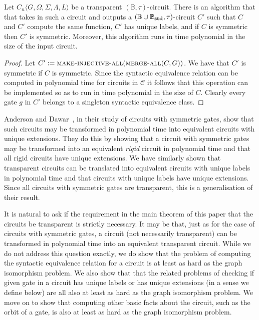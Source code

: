 \documentclass[../paper.tex]{subfiles}
\begin{document}
\begin{prop}
  Let $C_n \langle G, \Omega, \Sigma, \Lambda, L \rangle$ be a transparent
  $(\mathbb{B}, \tau)$-circuit. There is an algorithm that that takes in such a
  circuit and outputs a $(\mathbb{B} \cup \mathbb{B}_{\text{\textbf{std}}}, \tau)$-circuit $C'$
  such that $C$ and $C'$ compute the same function, $C'$ has unique labels, and
  if $C$ is symmetric then $C'$ is symmetric. Moreover, this algorithm runs in
  time polynomial in the size of the input circuit.
  \label{prop:transparent-unique}
\end{prop}
\begin{proof}
  Let $C' := {\normalfont\textsc{make-injective-all}}({\normalfont\textsc{merge-all}} (C, G))$. We have that $C'$
  is symmetric if $C$ is symmetric. Since the syntactic equivalence relation can
  be computed in polynomial time for circuits in $\mathcal{C}$ it follows that
  this operation can be implemented so as to run in time polynomial in the size
  of $C$. Clearly every gate $g$ in $C'$ belongs to a singleton syntactic
  equivalence class.
\end{proof}

Anderson and Dawar~\cite{AndersonD17}, in their study of circuits with symmetric
gates, show that such circuits may be transformed in polynomial time into
equivalent circuits with unique extensions. They do this by showing that a
circuit with symmetric gates may be transformed into an equivalent \emph{rigid}
circuit in polynomial time and that all rigid circuits have unique extensions.
We have similarly shown that transparent circuits can be translated into
equivalent circuits with unique labels in polynomial time and that circuits with
unique labels have unique extensions. Since all circuits with symmetric gates
are transparent, this is a generalisation of their result.

It is natural to ask if the requirement in the main theorem of this paper that
the circuits be transparent is strictly necessary. It may be that, just as for
the case of circuits with symmetric gates, a circuit (not necessarily
transparent) can be transformed in polynomial time into an equivalent
transparent circuit. While we do not address this question exactly, we do show
that the problem of computing the syntactic equivalence relation for a circuit
is at least as hard as the graph isomorphism problem. We also show that that the
related problems of checking if given gate in a circuit has unique labels or has
unique extensions (in a sense we define below) are all also at least as hard as
the graph isomorphism problem. We move on to show that computing other basic
facts about the circuit, such as the orbit of a gate, is also at least as hard
as the graph isomorphism problem.
\end{document}
